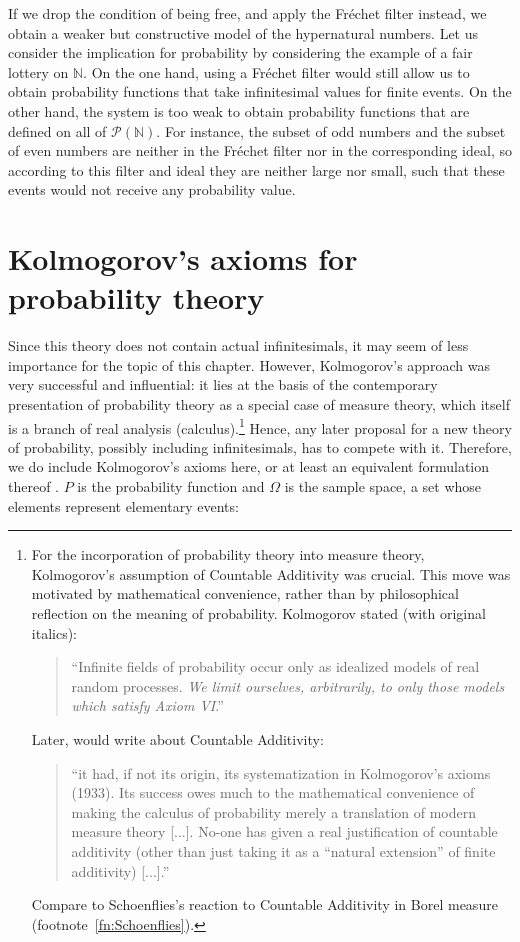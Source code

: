 If we drop the condition of being free, and apply the Fr\'{e}chet filter instead, we obtain a weaker but constructive model of the hypernatural numbers.
Let us consider the implication for probability by considering the example of a fair lottery on $\mathbb{N}$. On the one hand, using a Fr\'{e}chet filter would still allow us to obtain probability functions that take infinitesimal values for finite events. On the other hand, the system is too weak to obtain probability functions that are defined on all of $\mathcal{P}(\mathbb{N})$. For instance, the subset of odd numbers and the subset of even numbers are neither in the Fr\'{e}chet filter nor in the corresponding ideal, so according to this filter and ideal they are neither large nor small, such that these events would not receive any probability value.

\section{Kolmogorov's axioms for probability theory}\label{sec:KolmAxioms}
Since this theory does not contain actual infinitesimals, it may seem of less importance for the topic of this chapter. However, Kolmogorov's approach was very successful and influential: it lies at the basis of the contemporary presentation of probability theory as a special case of measure theory, which itself is a branch of real analysis (calculus).\footnote{For the incorporation of probability theory into measure theory, Kolmogorov's assumption of Countable Additivity was crucial. This move was motivated by mathematical convenience, rather than by philosophical reflection on the meaning of probability. Kolmogorov stated (with original italics):
\begin{quote}
``Infinite fields of probability occur only as idealized models of real random processes. \emph{We limit ourselves, arbitrarily, to only those models which satisfy Axiom VI}.'' \citep[p.~15]{Kolmogorov:1933}
\end{quote}
Later, \citet[Vol.~I, p.~119]{deFinetti:1974} would write about Countable Additivity:
\begin{quote}
``it had, if not its origin, its systematization in Kolmogorov's axioms (1933). Its success owes much to the mathematical convenience of making the calculus of probability merely a translation of modern measure theory [...]. No-one has given a real justification of countable additivity (other than just taking it as a ``natural extension'' of finite additivity) [...].''
\end{quote}
Compare to Schoenflies's reaction to Countable Additivity in Borel measure (footnote~\ref{fn:Schoenflies}).
} Hence, any later proposal for a new theory of probability, possibly including infinitesimals, has to compete with it. Therefore, we do include Kolmogorov's axioms here, or at least an equivalent formulation thereof \citep[taken from][]{Benci_etal:2013}. $P$ is the probability function and $\Omega$ is the sample space, a set whose elements represent elementary events:

